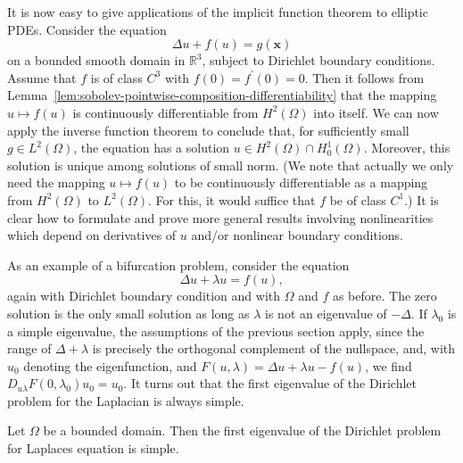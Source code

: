 It is now easy to give applications of the implicit function theorem to elliptic PDEs. Consider the equation
\begin{equation}\label{eq:semilinear-small-data-dirichlet-equation}
\Delta u+f(u)=g(\bm{x})
\end{equation}
on a bounded smooth domain in $\mathbb{R}^3$, subject to Dirichlet boundary conditions. Assume that $f$ is of class $C^3$ with $f(0)=f^{\prime}(0)=0$. Then it follows from Lemma~\ref{lem:sobolev-pointwise-composition-differentiability} that the mapping $u\mapsto f(u)$ is continuously differentiable from $H^2(\Omega)$ into itself. We can now apply the inverse function theorem to conclude that, for sufficiently small $g\in L^2(\Omega)$, the equation has a solution $u\in H^2(\Omega)\cap H_0^1(\Omega)$. Moreover, this solution is unique among solutions of small norm. (We note that actually we only need the mapping $u\mapsto f(u)$ to be continuously differentiable as a mapping from $H^2(\Omega)$ to $L^2(\Omega)$. For this, it would suffice that $f$ be of class $C^1$.) It is clear how to formulate and prove more general results involving nonlinearities which depend on derivatives of $u$ and/or nonlinear boundary conditions.

As an example of a bifurcation problem, consider the equation
\begin{equation}\label{eq:semilinear-dirichlet-eigenvalue-bifurcation-equation}
\Delta u+\lambda u=f(u),
\end{equation}
again with Dirichlet boundary condition and with $\Omega$ and $f$ as before. The zero solution is the only small solution as long as $\lambda$ is not an eigenvalue of $-\Delta$. If $\lambda_0$ is a simple eigenvalue, the assumptions of the previous section apply, since the range of $\Delta+\lambda$ is precisely the orthogonal complement of the nullspace, and, with $u_0$ denoting the eigenfunction, and $F(u,\lambda)=\Delta u+\lambda u-f(u)$, we find $D_{u\lambda}F(0,\lambda_0)u_0=u_0$. It turns out that the first eigenvalue of the Dirichlet problem for the Laplacian is always simple.

\begin{Lemma}
\label{lem:first-dirichlet-eigenvalue-simplicity}
Let $\Omega$ be a bounded domain. Then the first eigenvalue of the Dirichlet problem for Laplace\textquotesingle s equation is simple.
\end{Lemma}

